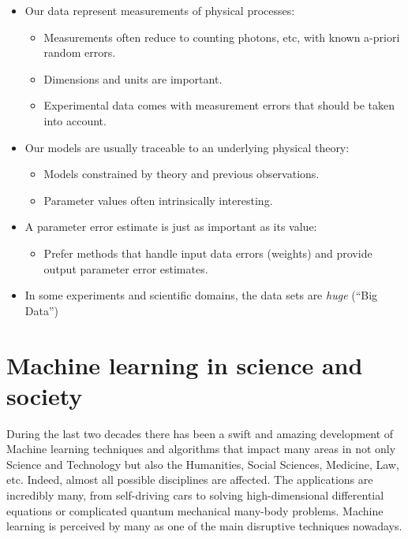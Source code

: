 \documentclass[%
oneside,                 %
final,                   %
10pt]{article}
\begin{document}
\noindent
\begin{itemize}
  \item Our data represent measurements of physical processes:
\begin{itemize}

    \item Measurements often reduce to counting photons, etc, with known a-priori random errors.

    \item Dimensions and units are important.

    \item Experimental data comes with measurement errors that should be taken into account.

\end{itemize}

\noindent
  \item Our models are usually traceable to an underlying physical theory:
\begin{itemize}

    \item Models constrained by theory and previous observations.

    \item Parameter values often intrinsically interesting.

\end{itemize}

\noindent
  \item A parameter error estimate is just as important as its value:
\begin{itemize}

    \item Prefer methods that handle input data errors (weights) and provide output parameter error estimates.

\end{itemize}

\noindent
  \item In some experiments and scientific domains, the data sets are \emph{huge} (``Big Data'')
\end{itemize}

\noindent
\section{Machine learning in science and society}

During the last two decades there has been a swift and amazing
development of Machine learning techniques and algorithms that impact
many areas in not only Science and Technology but also the Humanities,
Social Sciences, Medicine, Law, etc. Indeed, almost all possible
disciplines are affected. The applications are incredibly many, from self-driving
cars to solving high-dimensional differential equations or complicated
quantum mechanical many-body problems. Machine learning is perceived
by many as one of the main disruptive techniques nowadays. 
\end{document}
